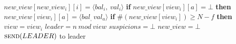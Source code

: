 \begin{algorithm}
\begin{algorithmic}[1]
		\State
		\State\hspace{\algorithmicindent} $new\_view[new\_view_i][i] = \langle bal_i,\ val_i \rangle$
		\State\hspace{\algorithmicindent} \textbf{if} $new\_view[view_i][a] = \bot$ \textbf{then}
		\State\hspace{\algorithmicindent}\hspace{\algorithmicindent} $new\_view[view_i][a] = \langle bal_,\ val_a \rangle$
		\State\hspace{\algorithmicindent}\hspace{\algorithmicindent}  
		\State
		\State\hspace{\algorithmicindent} \textbf{if} $\#(new\_view[view_i]) \geq N-f$ \textbf{then}
		\State\hspace{\algorithmicindent}\hspace{\algorithmicindent} $view = view_i$
		\State\hspace{\algorithmicindent}\hspace{\algorithmicindent} $leader = n\ mod\ view$
		\State\hspace{\algorithmicindent}\hspace{\algorithmicindent} $suspicions = \bot$
		\State\hspace{\algorithmicindent}\hspace{\algorithmicindent} $new\_view = \bot$
		\State\hspace{\algorithmicindent}\hspace{\algorithmicindent} $\Call{send}{LEADER}$ to leader
	\end{algorithmic}
\end{algorithm}

